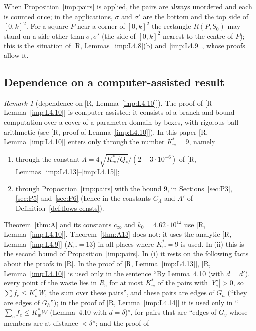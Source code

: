 \documentclass[11pt]{amsart}
\theoremstyle{definition}
\theoremstyle{remark}
\newtheorem{remark}[theorem]{Remark}
\numberwithin{equation}{section}
\begin{document}
When Proposition~\ref{imp:pairs} is applied, the pairs are always unordered and each is counted once; in the
applications, $\sigma$ and $\sigma'$ are the bottom and the top side of $[0,k]^2$. For a square $P$ near a corner of
$[0,k]^2$ the rectangle $R(P,S_0)$ may stand on a side other than $\sigma,\sigma'$ (the side of $[0,k]^2$ nearest to the
centre of $P$); this is the situation of [R, Lemmas~\ref{imp:L4.8}(b) and~\ref{imp:L4.9}], whose proofs allow it.

\subsection{Dependence on a computer-assisted result}

\begin{remark}[dependence on {[R, Lemma~\ref{imp:L4.10}]}]\label{rem:imp-dep}
The proof of [R, Lemma~\ref{imp:L4.10}] is computer-assisted: it consists of a branch-and-bound computation over a
cover of a parameter domain by boxes, with rigorous ball arithmetic (see [R, proof of Lemma~\ref{imp:L4.10}]).
In this paper [R, Lemma~\ref{imp:L4.10}] enters only through the number $K_w^*=9$, namely
\begin{enumerate}[label=(\roman*)]
\item through the constant $A=4\sqrt{K_w^*/Q_*}/(2-3\cdot10^{-6})$ of [R, Lemmas~\ref{imp:L4.13}--\ref{imp:L4.15}];
\item through Proposition~\ref{imp:pairs} with the bound $9$, in Sections~\ref{sec:P3}, \ref{sec:P5} and~\ref{sec:P6}
(hence in the constants $C_\Lambda$ and $A'$ of Definition~\ref{def:flows-consts}).
\end{enumerate}
Theorem~\ref{thm:A} and its constants $c_\infty$ and $k_0=4.62\cdot10^{12}$ use [R, Lemma~\ref{imp:L4.10}].
Theorem~\ref{thm:A13} does not: it uses the analytic [R, Lemma~\ref{imp:L4.9}] ($K_w=13$) in all places where
$K_w^*=9$ is used. In (ii) this is the second bound of Proposition~\ref{imp:pairs}. In (i) it rests on the following
facts about the proofs in [R]. In the proof of [R, Lemma~\ref{imp:L4.13}], [R, Lemma~\ref{imp:L4.10}] is used only
in the sentence ``By Lemma~4.10 (with $d=d'$), every point of the waste lies in $R_e$ for at most $K_w^*$ of the pairs
with $|Y_e^c|>0$, so $\sum f_e\le K_w^*W$, the sum over these pairs'', and these pairs are edges of $G_h$ (``they are
edges of $G_h$''); in the
proof of [R, Lemma~\ref{imp:L4.14}] it is used only in ``$\sum_ef_e\le K_w^*W$ (Lemma~4.10 with $d=\delta$)'', for
pairs that are ``edges of $G_v$ whose members are at distance $<\delta$''; and the proof of

\end{remark}
\end{document}
